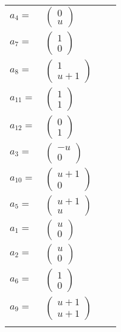\documentclass[1p]{elsarticle_modified}
\theoremstyle{definition}
\begin{document}
\begin{tabular}{m{7pt} m{180pt} m{7pt} m{180pt} }
\flushright $a_{4}=$&$\begin{pmatrix}0\\u\end{pmatrix}$ \\
\flushright $a_{7}=$&$\begin{pmatrix}1\\0\end{pmatrix}$ \\
\flushright $a_{8}=$&$\begin{pmatrix}1\\u+1\end{pmatrix}$ \\
\flushright $a_{11}=$&$\begin{pmatrix}1\\1\end{pmatrix}$ \\
\flushright $a_{12}=$&$\begin{pmatrix}0\\1\end{pmatrix}$ \\
\flushright $a_{3}=$&$\begin{pmatrix}- u\\0\end{pmatrix}$ \\
\flushright $a_{10}=$&$\begin{pmatrix}u+1\\0\end{pmatrix}$ \\
\flushright $a_{5}=$&$\begin{pmatrix}u+1\\u\end{pmatrix}$ \\
\flushright $a_{1}=$&$\begin{pmatrix}u\\0\end{pmatrix}$ \\
\flushright $a_{2}=$&$\begin{pmatrix}u\\0\end{pmatrix}$ \\
\flushright $a_{6}=$&$\begin{pmatrix}1\\0\end{pmatrix}$ \\
\flushright $a_{9}=$&$\begin{pmatrix}u+1\\u+1\end{pmatrix}$\\&\end{tabular}
\end{document}

